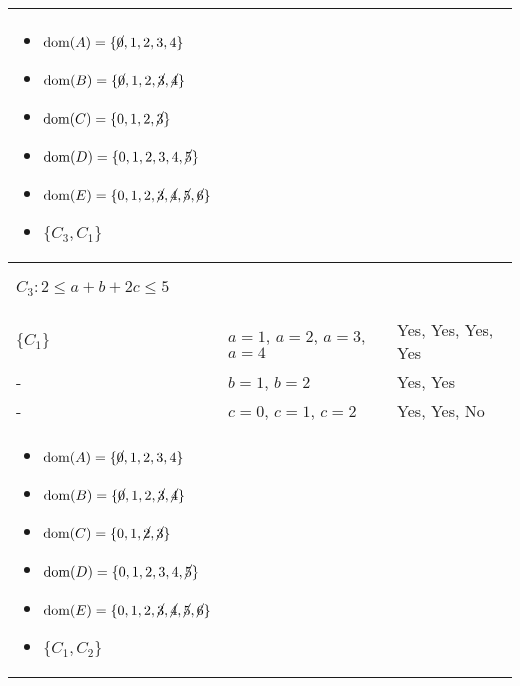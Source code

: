 \begin{example}
\begin{center}
\begin{tabular}{lll}
{\begin{itemize}
                \item $\text{dom}(A) = \{\cancel{0}, 1, 2, 3, 4\}$
                \item $\text{dom}(B) = \{\cancel{0}, 1, 2, \cancel{3}, \cancel{4}\} $
                \item $\text{dom}(C) = \{0, 1, 2, \cancel{3}\} $
                \item $\text{dom}(D) = \{0, 1, 2, 3, 4, \cancel{5}\} $
                \item $\text{dom}(E) = \{0, 1, 2, \cancel{3}, \cancel{4}, \cancel{5}, \cancel{6}\} $
                \item $\{C_3, C_1\}$
            \end{itemize}} \\
            \midrule
            \multicolumn{3}{p{\linewidth}}{
            \begin{center}
                $C_3: 2 \leq a + b + 2c \leq 5$
            \end{center}} \\
            $\{C_1\}$ & $a=1$, $a=2$, $a=3$, $a=4$ & Yes, Yes, Yes, Yes \\
            - & $b=1$, $b=2$ & Yes, Yes \\
            - & $c=0$, $c=1$, $c=2$ & Yes, Yes, No \\
            \multicolumn{3}{p{\linewidth}}{
            \begin{itemize}
                \item $\text{dom}(A) = \{\cancel{0}, 1, 2, 3, 4\}$
                \item $\text{dom}(B) = \{\cancel{0}, 1, 2, \cancel{3}, \cancel{4}\} $
                \item $\text{dom}(C) = \{0, 1, \cancel{2}, \cancel{3}\} $
                \item $\text{dom}(D) = \{0, 1, 2, 3, 4, \cancel{5}\} $
                \item $\text{dom}(E) = \{0, 1, 2, \cancel{3}, \cancel{4}, \cancel{5}, \cancel{6}\} $
                \item $\{C_1, C_2\}$
            \end{itemize}} \\
            \midrule
        \end{tabular}
    \end{center}
\end{example}
\newpage

